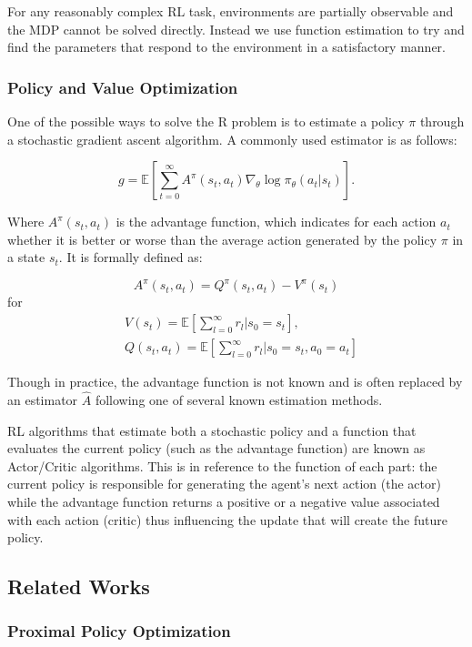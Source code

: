 For any reasonably complex RL task, environments are partially observable and the MDP cannot be solved directly. Instead we use function estimation to try and find the parameters that respond to the environment in a satisfactory manner. 

\subsubsection*{Policy and Value Optimization}

 One of the possible ways to solve the R problem is to estimate a policy $\pi$ through a stochastic gradient ascent algorithm. A commonly used estimator is as follows:

\[
g = \mathbb{E}
\left[\sum^{\infty}_{t=0} A^{\pi}(s_t, a_t) \nabla_{\theta}\log\pi_{\theta}(a_t | s_t) \right].
\]


Where $A^{\pi}(s_t, a_t)$ is the advantage function, which indicates for each action $a_t$ whether it is better or worse than the average action generated by the policy $\pi$ in a state $s_t$. It is formally defined as:

\[
A^\pi(s_t,a_t) = Q^\pi(s_t, a_t) - V^\pi(s_t)
\]
for
\begin{align*}
&V(s_t) = \mathbb{E}\left[\sum_{l=0}^{\infty} r_l | s_0 = s_t \right],\\
&Q(s_t, a_t) = \mathbb{E}\left[\sum_{l=0}^{\infty} r_l | s_0 = s_t, a_0 = a_t \right]
\end{align*}

Though in practice, the advantage function is not known and is often replaced by an estimator $\hat{A}$ following one of several known estimation methods.

RL algorithms that estimate both a stochastic policy and a function that evaluates the current policy (such as the advantage function) are known as Actor/Critic algorithms. This is in reference to the function of each part: the current policy is responsible for generating the agent's next action (the actor) while the advantage function returns a positive or a negative value associated with each action (critic) thus influencing the update that will create the future policy.

\subsection{Related Works}

\subsubsection*{Proximal Policy Optimization}

